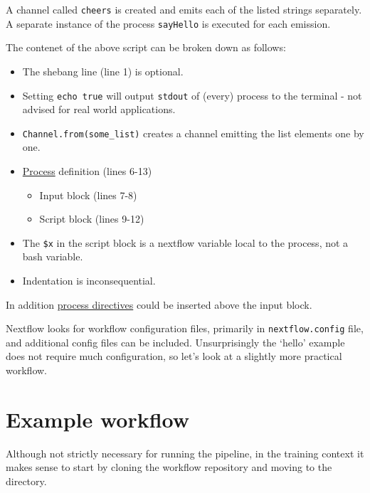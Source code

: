 A channel called \texttt{cheers} is created and emits each of the listed strings separately. 
A separate instance of the process \texttt{sayHello} is executed for each emission. 

\begin{note}
The contenet of the above script can be broken down as follows:
\begin{itemize}
  \item The shebang line (line 1) is optional.
  \item Setting \texttt{echo true} will output \texttt{stdout} of (every) process to the terminal - not advised for real world applications.
  \item \texttt{Channel.from(some\_list)} creates a channel emitting the list elements one by one.
  \item \href{https://www.nextflow.io/docs/latest/process.html}{Process} definition (lines 6-13)
  \begin{itemize}
    \item Input block (lines 7-8)
    \item Script block (lines 9-12)
  \end{itemize}
  \item The \texttt{\$x} in the script block is a nextflow variable local to the process, not a bash variable.
  \item Indentation is inconsequential. 
\end{itemize}
In addition \href{https://www.nextflow.io/docs/latest/process.html#directives}{process directives} could be inserted above the input block.
\end{note}


\begin{information}
Nextflow looks for workflow configuration files, primarily in \texttt{nextflow.config} file, and additional config files can be included. Unsurprisingly the `hello' example does not require much configuration, so let's look at a slightly more practical workflow.
\end{information}

\newpage

\section{Example workflow}

Although not strictly necessary for running the pipeline, in the training context it makes sense to start by cloning the workflow repository and moving to the directory.


